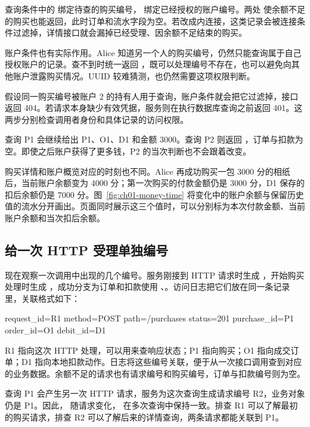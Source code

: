 查询条件中的  绑定待查的购买编号， 绑定已经授权的账户编号。两处  使余额不足的购买也能返回，此时订单和流水字段为空。若改成内连接，这类记录会被连接条件过滤掉，详情接口就会漏掉已经受理、因余额不足结束的购买。

账户条件也有实际作用。Alice 知道另一个人的购买编号，仍然只能查询属于自己授权账户的记录。查不到时统一返回 ，既可以处理编号不存在，也可以避免向其他账户泄露购买情况。UUID 较难猜测，也仍然需要这项权限判断。

假设同一购买编号被账户 2 的持有人用于查询，账户条件就会把它过滤掉，接口返回 404。若请求本身缺少有效凭据，服务则在执行数据库查询之前返回 401。这两步分别检查调用者身份和具体记录的访问权限。

查询 P1 会继续给出 P1、O1、D1 和金额 3000。查询 P2 则返回 ，订单与扣款为空。即使之后账户获得了更多钱，P2 的当次判断也不会跟着改变。

购买详情和账户概览对应的时刻也不同。Alice 再成功购买一包 3000 分的相纸后，当前账户余额变为 4000 分；第一次购买的付款金额仍是 3000 分，D1 保存的扣后余额仍是 7000 分。图~\ref{fig:ch01-money-time} 将变化中的账户余额与保留历史值的流水分开画出。页面同时展示这三个值时，可以分别标为本次付款金额、当前账户余额和当次扣后余额。



\subsection*{给一次 HTTP 受理单独编号}

现在观察一次调用中出现的几个编号。服务刚接到 HTTP 请求时生成 ，开始购买处理时生成 ，成功分支为订单和扣款使用 、。访问日志把它们放在同一条记录里，关联格式如下：

\begin{BookCode}
request_id=R1 method=POST path=/purchases status=201
purchase_id=P1 order_id=O1 debit_id=D1
\end{BookCode}

R1 指向这次 HTTP 处理，可以用来查响应状态；P1 指向购买；O1 指向成交订单；D1 指向本地扣款动作。日志将这些编号关联，便于从一次接口调用查到对应的业务数据。余额不足的请求也有请求编号和购买编号，订单与扣款编号则为空。

查询 P1 会产生另一次 HTTP 请求，服务为这次查询生成请求编号 R2，业务对象仍是 P1。因此， 随请求变化， 在多次查询中保持一致。排查 R1 可以了解最初的购买请求，排查 R2 可以了解后来的详情查询，两条请求都能关联到 P1。

